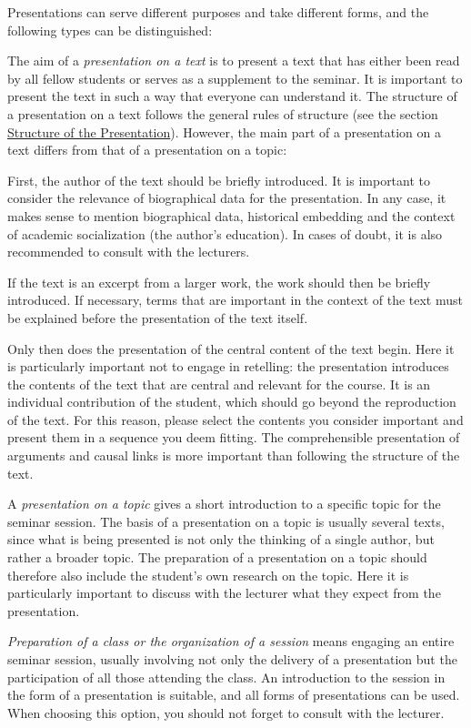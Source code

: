\documentclass[
  english,
]{scrreprt}
\begin{document}
Presentations can serve different purposes and take different forms, and the following types can be distinguished:

The aim of a \emph{presentation on a text} is to present a text that has either been read by all fellow students or serves as a supplement to the seminar. It is important to present the text in such a way that everyone can understand it. The structure of a presentation on a text follows the general rules of structure (see the section \hyperref[sec:presentation_structure]{Structure of the Presentation}). However, the main part of a presentation on a text differs from that of a presentation on a topic:

First, the author of the text should be briefly introduced. It is important to consider the relevance of biographical data for the presentation. In any case, it makes sense to mention biographical data, historical embedding and the context of academic socialization (the author’s education). In cases of doubt, it is also recommended to consult with the lecturers.

If the text is an excerpt from a larger work, the work should then be briefly introduced. If necessary, terms that are important in the context of the text must be explained before the presentation of the text itself.

Only then does the presentation of the central content of the text begin. Here it is particularly important not to engage in retelling: the presentation introduces the contents of the text that are central and relevant for the course. It is an individual contribution of the student, which should go beyond the reproduction of the text. For this reason, please select the contents you consider important and present them in a sequence you deem fitting. The comprehensible presentation of arguments and causal links is more important than following the structure of the text.

A \emph{presentation on a topic} gives a short introduction to a specific topic for the seminar session. The basis of a presentation on a topic is usually several texts, since what is being presented is not only the thinking of a single author, but rather a broader topic. The preparation of a presentation on a topic should therefore also include the student’s own research on the topic. Here it is particularly important to discuss with the lecturer what they expect from the presentation.

\emph{Preparation of a class or the organization of a session} means engaging an entire seminar session, usually involving not only the delivery of a presentation but the participation of all those attending the class. An introduction to the session in the form of a presentation is suitable, and all forms of presentations can be used. When choosing this option, you should not forget to consult with the lecturer.
\end{document}

